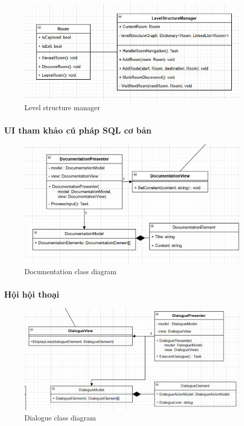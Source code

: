\begin{figure}[H]
	\centering
	\includegraphics[width=13cm]{Images/LevelStructureManager.png}
	\vspace{0.5cm}
	\caption{Level structure manager}
\end{figure}

\subsubsection{UI tham khảo cú pháp SQL cơ bản}
\begin{figure}[H]
	\centering
	\includegraphics[width=13cm]{Images/DocumentationView.png}
	\vspace{0.5cm}
	\caption{Documentation class diagram}
\end{figure}

\subsubsection{Hội hội thoại}
\begin{figure}[H]
	\centering
	\includegraphics[width=13cm]{Images/DialogueView.png}
	\vspace{0.5cm}
	\caption{Dialogue class diagram}
\end{figure}

